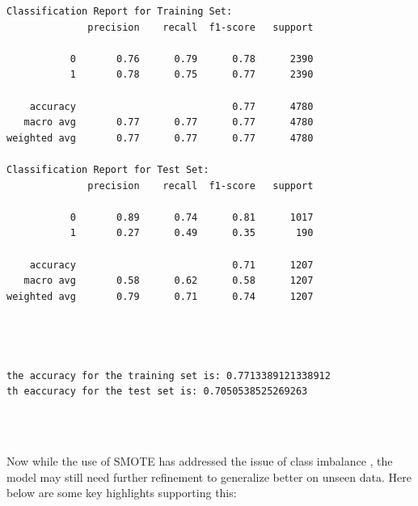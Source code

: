 \documentclass[11pt]{article}
\begin{document}
    \begin{Verbatim}[commandchars=\\\{\}]
Classification Report for Training Set:
              precision    recall  f1-score   support

           0       0.76      0.79      0.78      2390
           1       0.78      0.75      0.77      2390

    accuracy                           0.77      4780
   macro avg       0.77      0.77      0.77      4780
weighted avg       0.77      0.77      0.77      4780

Classification Report for Test Set:
              precision    recall  f1-score   support

           0       0.89      0.74      0.81      1017
           1       0.27      0.49      0.35       190

    accuracy                           0.71      1207
   macro avg       0.58      0.62      0.58      1207
weighted avg       0.79      0.71      0.74      1207




the accuracy for the training set is: 0.7713389121338912
th eaccuracy for the test set is: 0.7050538525269263


    \end{Verbatim}

    \begin{center}
    \end{center}
    { \hspace*{\fill} \\}
    
    Now while the use of SMOTE has addressed the issue of class imbalance ,
the model may still need further refinement to generalize better on
unseen data. Here below are some key highlights supporting this:
\end{document}
